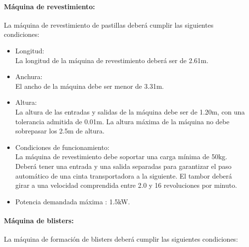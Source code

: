 \paragraph{Máquina de revestimiento:}
		La máquina de revestimiento de pastillas deberá cumplir las siguientes condiciones:
		
		\begin{itemize}
			\item{Longitud:}\\
			La longitud de la máquina de revestimiento deberá ser de 2.61m. 

			\item{Anchura:}\\
			El ancho de la máquina debe ser menor de 3.31m.
			
			\item{Altura:}\\
			La altura de las entradas y salidas de la máquina debe ser de 1.20m, con una tolerancia admitida de 0.01m.
			La altura máxima de la máquina no debe sobrepasar los 2.5m de altura.
			
			
			\item{Condiciones de funcionamiento: }\\
			La máquina de revestimiento debe soportar una carga mínima de 50kg. Deberá tener una entrada y una salida separadas para garantizar el paso automático de una cinta transportadora a la siguiente. El tambor deberá girar a una velocidad comprendida entre 2.0 y 16 revoluciones por minuto.
			

			\item{Potencia demandada máxima :} 1.5kW.
		
		\end{itemize}



\paragraph{Máquina de blisters:}
		La máquina de formación de blisters deberá cumplir las siguientes condiciones:
		
